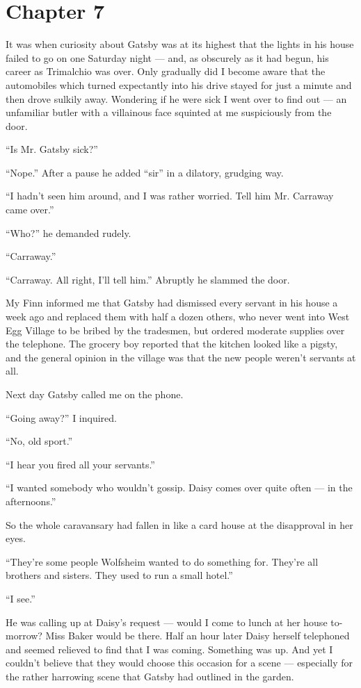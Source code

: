 \documentclass{znotebook}
\begin{document}
\chapter{Chapter 7}

It was when curiosity about Gatsby was at its highest that the lights in his house failed to go on one Saturday night — and, as obscurely as it had begun, his career as Trimalchio was over. Only gradually did I become aware that the automobiles which turned expectantly into his drive stayed for just a minute and then drove sulkily away. Wondering if he were sick I went over to find out — an unfamiliar butler with a villainous face squinted at me suspiciously from the door.

``Is Mr. Gatsby sick?''

``Nope.'' After a pause he added ``sir'' in a dilatory, grudging way.

``I hadn’t seen him around, and I was rather worried. Tell him Mr. Carraway came over.''

``Who?'' he demanded rudely.

``Carraway.''

``Carraway. All right, I’ll tell him.'' Abruptly he slammed the door.

My Finn informed me that Gatsby had dismissed every servant in his house a week ago and replaced them with half a dozen others, who never went into West Egg Village to be bribed by the tradesmen, but ordered moderate supplies over the telephone. The grocery boy reported that the kitchen looked like a pigsty, and the general opinion in the village was that the new people weren’t servants at all.

Next day Gatsby called me on the phone.

``Going away?'' I inquired.

``No, old sport.''

``I hear you fired all your servants.''

``I wanted somebody who wouldn’t gossip. Daisy comes over quite often — in the afternoons.''

So the whole caravansary had fallen in like a card house at the disapproval in her eyes.

``They’re some people Wolfsheim wanted to do something for. They’re all brothers and sisters. They used to run a small hotel.''

``I see.''

He was calling up at Daisy’s request — would I come to lunch at her house to-morrow? Miss Baker would be there. Half an hour later Daisy herself telephoned and seemed relieved to find that I was coming. Something was up. And yet I couldn’t believe that they would choose this occasion for a scene — especially for the rather harrowing scene that Gatsby had outlined in the garden.
\end{document}
